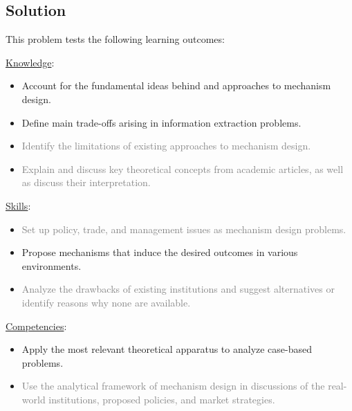 \documentclass[a4paper]{article}
\newif\ifsolutions
\begin{document}
\ifsolutions
\subsection*{Solution}
	This problem tests the following learning outcomes:
	\begin{framed}
		\underline{Knowledge}:
		\begin{itemize}[$\circ$]
			\item {Account for the fundamental ideas behind and approaches to mechanism design.}
			\item {Define main trade-offs arising in information extraction problems.}
			\item \textcolor{gray}{Identify the limitations of existing approaches to mechanism design.}
			\item \textcolor{gray}{Explain and discuss key theoretical concepts from academic articles, as well as discuss their interpretation.}
		\end{itemize}
		\underline{Skills}:
		\begin{itemize}[$\circ$]
			\item \textcolor{gray}{Set up policy, trade, and management issues as mechanism design problems.}
			\item {Propose mechanisms that induce the desired outcomes in various environments.}
			\item \textcolor{gray}{Analyze the drawbacks of existing institutions and suggest alternatives or identify reasons why none are available.}
		\end{itemize}
		\underline{Competencies}:
		\begin{itemize}[$\circ$]
			\item {Apply the most relevant theoretical apparatus to analyze case-based problems.}
			\item \textcolor{gray}{Use the analytical framework of mechanism design in discussions of the real-world institutions, proposed policies, and market strategies.}
		\end{itemize}
	\end{framed}
	
\end{document}
